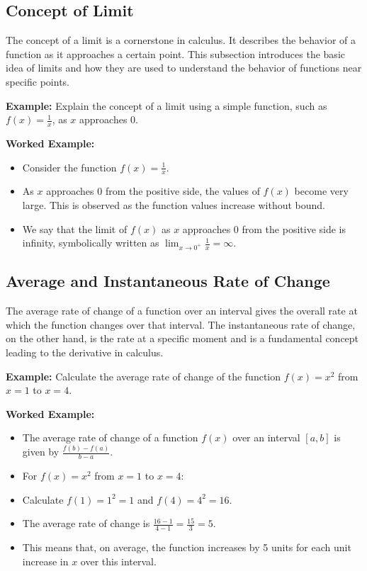 \documentclass{book}
\begin{document}
\subsection{Concept of Limit}
The concept of a limit is a cornerstone in calculus. It describes the behavior of a function as it approaches a certain point. This subsection introduces the basic idea of limits and how they are used to understand the behavior of functions near specific points.


\textbf{Example:} Explain the concept of a limit using a simple function, such as \( f(x) = \frac{1}{x} \), as \( x \) approaches 0.


\textbf{Worked Example:}
\begin{itemize}
        \item Consider the function \( f(x) = \frac{1}{x} \).
        \item As \( x \) approaches 0 from the positive side, the values of \( f(x) \) become very large. This is observed as the function values increase without bound.
        \item We say that the limit of \( f(x) \) as \( x \) approaches 0 from the positive side is infinity, symbolically written as \( \lim_{x \to 0^+} \frac{1}{x} = \infty \).
\end{itemize}


\subsection{Average and Instantaneous Rate of Change}
The average rate of change of a function over an interval gives the overall rate at which the function changes over that interval. The instantaneous rate of change, on the other hand, is the rate at a specific moment and is a fundamental concept leading to the derivative in calculus.


\textbf{Example:} Calculate the average rate of change of the function \( f(x) = x^2 \) from \( x = 1 \) to \( x = 4 \).


\textbf{Worked Example:}
\begin{itemize}
        \item The average rate of change of a function \( f(x) \) over an interval \( [a, b] \) is given by \( \frac{f(b) - f(a)}{b - a} \).
        \item For \( f(x) = x^2 \) from \( x = 1 \) to \( x = 4 \):
        \item Calculate \( f(1) = 1^2 = 1 \) and \( f(4) = 4^2 = 16 \).
        \item The average rate of change is \( \frac{16 - 1}{4 - 1} = \frac{15}{3} = 5 \).
        \item This means that, on average, the function increases by 5 units for each unit increase in \( x \) over this interval.
\end{itemize}
\end{document}
